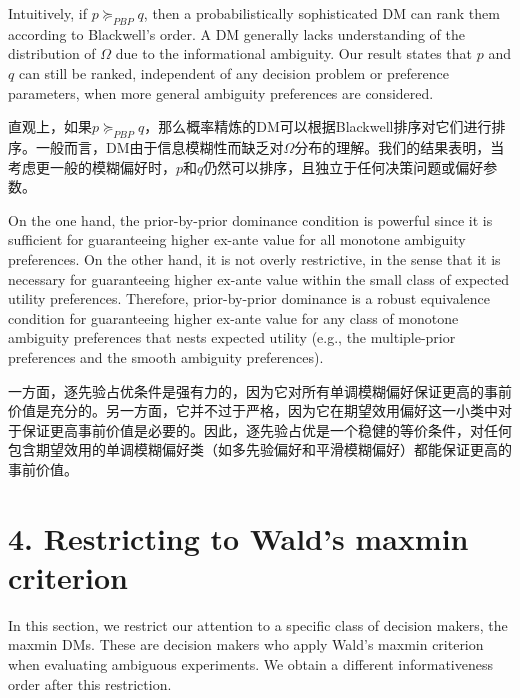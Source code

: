 \documentclass[12pt,a4paper]{article}
\newenvironment{original}
  {\par\vspace{4pt}\noindent\color{black}\ignorespaces}
  {\par\vspace{2pt}}
\newenvironment{translation}
  {\par\vspace{2pt}\noindent\color{myblue}\ignorespaces}
  {\par\vspace{6pt}}
\newcommand{\bisection}[2]{%
  \section{#1}%
  \vspace{-2pt}%
  \noindent{\color{myblue}\large\bfseries #2}%
  \vspace{6pt}%
}
\begin{document}
\begin{original}
Intuitively, if $p\succeq_{PBP} q$, then a probabilistically sophisticated DM can rank them according to Blackwell's order. A DM generally lacks understanding of the distribution of $\Omega$ due to the informational ambiguity. Our result states that $p$ and $q$ can still be ranked, independent of any decision problem or preference parameters, when more general ambiguity preferences are considered.
\end{original}

\begin{translation}
直观上，如果$p\succeq_{PBP} q$，那么概率精炼的DM可以根据Blackwell排序对它们进行排序。一般而言，DM由于信息模糊性而缺乏对$\Omega$分布的理解。我们的结果表明，当考虑更一般的模糊偏好时，$p$和$q$仍然可以排序，且独立于任何决策问题或偏好参数。
\end{translation}

\begin{original}
On the one hand, the prior-by-prior dominance condition is powerful since it is sufficient for guaranteeing higher ex-ante value for all monotone ambiguity preferences. On the other hand, it is not overly restrictive, in the sense that it is necessary for guaranteeing higher ex-ante value within the small class of expected utility preferences. Therefore, prior-by-prior dominance is a robust equivalence condition for guaranteeing higher ex-ante value for any class of monotone ambiguity preferences that nests expected utility (e.g., the multiple-prior preferences and the smooth ambiguity preferences).
\end{original}

\begin{translation}
一方面，逐先验占优条件是强有力的，因为它对所有单调模糊偏好保证更高的事前价值是充分的。另一方面，它并不过于严格，因为它在期望效用偏好这一小类中对于保证更高事前价值是必要的。因此，逐先验占优是一个稳健的等价条件，对任何包含期望效用的单调模糊偏好类（如多先验偏好和平滑模糊偏好）都能保证更高的事前价值。
\end{translation}


\bisection{4. Restricting to Wald's maxmin criterion}{4. 限制于Wald最大最小准则}

\begin{original}
In this section, we restrict our attention to a specific class of decision makers, the maxmin DMs. These are decision makers who apply Wald's maxmin criterion when evaluating ambiguous experiments. We obtain a different informativeness order after this restriction.
\end{original}
\end{document}
